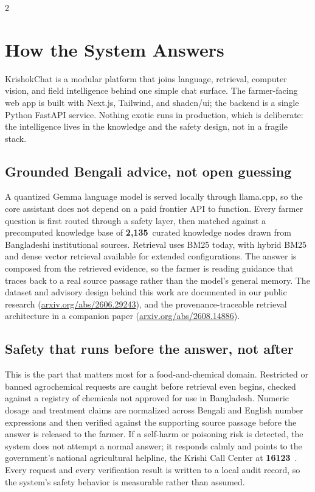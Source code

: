 \documentclass[11pt]{article}
\newcommand{\stat}[2]{{\color{brandgreen}\textbf{#1}}\ #2}
\begin{document}
\begin{multicols}{2}
\section{How the System Answers}

KrishokChat is a modular platform that joins language, retrieval, computer vision, and field intelligence behind one simple chat surface. The farmer-facing web app is built with Next.js, Tailwind, and shadcn/ui; the backend is a single Python FastAPI service. Nothing exotic runs in production, which is deliberate: the intelligence lives in the knowledge and the safety design, not in a fragile stack.

\subsection{Grounded Bengali advice, not open guessing}

A quantized Gemma language model is served locally through llama.cpp, so the core assistant does not depend on a paid frontier API to function. Every farmer question is first routed through a safety layer, then matched against a precomputed knowledge base of \stat{2{,}135}{curated knowledge nodes} drawn from Bangladeshi institutional sources. Retrieval uses BM25 today, with hybrid BM25 and dense vector retrieval available for extended configurations. The answer is composed from the retrieved evidence, so the farmer is reading guidance that traces back to a real source passage rather than the model's general memory. The dataset and advisory design behind this work are documented in our public research (\href{https://arxiv.org/abs/2606.29243}{arxiv.org/abs/2606.29243}), and the provenance-traceable retrieval architecture in a companion paper (\href{https://arxiv.org/abs/2608.14886}{arxiv.org/abs/2608.14886}).

\subsection{Safety that runs before the answer, not after}

This is the part that matters most for a food-and-chemical domain. Restricted or banned agrochemical requests are caught before retrieval even begins, checked against a registry of chemicals not approved for use in Bangladesh. Numeric dosage and treatment claims are normalized across Bengali and English number expressions and then verified against the supporting source passage before the answer is released to the farmer. If a self-harm or poisoning risk is detected, the system does not attempt a normal answer; it responds calmly and points to the government's national agricultural helpline, the Krishi Call Center at \stat{16123}{}. Every request and every verification result is written to a local audit record, so the system's safety behavior is measurable rather than assumed.


\end{multicols}
\end{document}
